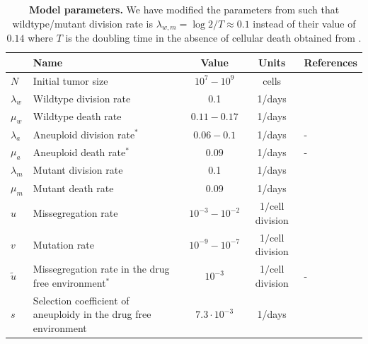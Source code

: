 \documentclass[12pt]{extarticle}
\begin{document}
\nolinenumbers
%



\newpage
\begin{table}
\begin{center}
  \begin{tabular}{| l |p{5cm}| c | c | p{3cm} |}
    \hline
     & Name & Value & Units & References \\ \hline
    $N$ & Initial tumor size & $10^7-10^9$ & cells  & \citet{del2009does} \\ \hline
    $\lambda_w$ & Wildtype division rate& 0.1 & 1/days  & \citet{bozic2013evolutionary,rew2000cell} \\ \hline
    $\mu_w$ & Wildtype death rate& $0.11-0.17$ & 1/days  & \citet{bozic2013evolutionary} \\ \hline
    $\lambda_a$  & Aneuploid division rate$^\ast$ & $0.06-0.1$ & 1/days  & - \\ \hline
    $\mu_a$ & Aneuploid death rate$^\ast$ & $0.09$ & 1/days  & - \\ \hline
    $\lambda_m$ & Mutant division rate& 0.1 & 1/days  & \citet{bozic2013evolutionary,rew2000cell} \\ \hline
    $\mu_m$ & Mutant death rate& 0.09 & 1/days  & \citet{bozic2013evolutionary,carlson2003tumor} \\ \hline
    $u$ & Missegregation rate& $10^{-3}-10^{-2}$ & 1$\slash$cell division  & \citet{bakker2023predicting} \\ \hline
    $v$ & Mutation rate& $10^{-9}-10^{-7}$ &  1$\slash$cell division  & \citet{bozic2013evolutionary,loeb2001mutator} \\  \hline
    $\tilde{u}$ & Missegregation rate in the drug free environment$^\ast$& $10^{-3}$ & 1$\slash$cell division  & - \\ \hline
    $s$ & Selection coefficient of aneuploidy in the drug free environment& $7.3\cdot10^{-3}$ &  1/days   & \citet{lukow2021chromosomal} \\  
    \hline
  \end{tabular}
\caption{\textbf{Model parameters.} 
We have modified the parameters from \citet{bozic2013evolutionary} such that wildtype/mutant division rate is $\lambda_{w,m}=\log2/T\approx0.1$ instead of their value of $0.14$ where $T$ is the doubling time in the absence of cellular death obtained from \citet{rew2000cell}.}
  \label{table1}
\end{center}
\end{table}
\end{document}
